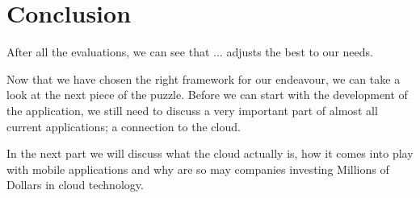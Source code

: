 \section{Conclusion}

After all the evaluations, we can see that ... adjusts the best to our needs. 




Now that we have chosen the right framework for our endeavour, we can take a look at the next piece of the puzzle. Before we can start with the development of the application, we still need to discuss a very important part of almost all current applications; a connection to the cloud. 

In the next part we will discuss what the cloud actually is, how it comes into play with mobile applications and why are so may companies investing Millions of Dollars in cloud technology. 